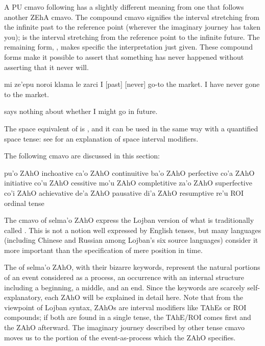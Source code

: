 A PU cmavo following  has a slightly different
    meaning from one that follows another ZEhA cmavo. The compound
    cmavo  signifies the interval stretching from the
    infinite past to the reference point (wherever the imaginary
    journey has taken you);  is the interval stretching
    from the reference point to the infinite future. The remaining
    form, , makes specific the 
    interpretation just given. These compound forms make it
    possible to assert that something has never happened without
    asserting that it never will.
\begin{example}
mi ze'epu noroi klama le zarci\n
I  [past] [never] go-to the market.\n
I have never gone to the market.
\end{example}

{\noindent}says nothing about whether I might go in future. 

The space equivalent of  is , and it can be
    used in the same way with a quantified space tense: see  for an explanation of space interval
    modifiers.




The following cmavo are discussed in this section:

   pu'o    ZAhO    inchoative
    ca'o    ZAhO    continuitive
    ba'o    ZAhO    perfective
    co'a    ZAhO    initiative
    co'u    ZAhO    cessitive
    mo'u    ZAhO    completitive
    za'o    ZAhO    superfective
    co'i    ZAhO    achievative
    de'a    ZAhO    pausative
    di'a    ZAhO    resumptive
    re'u    ROI ordinal tense

The cmavo of selma'o ZAhO express the Lojban version of what is
    traditionally called . This is not a notion well
    expressed by English tenses, but many languages (including
    Chinese and Russian among Lojban's six source languages)
    consider it more important than the specification of mere
    position in time. 

The  of selma'o ZAhO, with their bizarre
    keywords, represent the natural portions of an event considered
    as a process, an occurrence with an internal structure
    including a beginning, a middle, and an end. Since the keywords
    are scarcely self-explanatory, each ZAhO will be explained in
    detail here. Note that from the viewpoint of Lojban syntax,
    ZAhOs are interval modifiers like TAhEs or ROI compounds; if
    both are found in a single tense, the TAhE/ROI comes first and
    the ZAhO afterward. The imaginary journey described by other
    tense cmavo moves us to the portion of the event-as-process
    which the ZAhO specifies.

